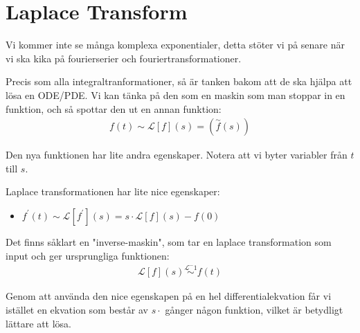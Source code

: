 \section{Laplace Transform}\par
\noindent Vi kommer inte se många komplexa exponentialer, detta stöter vi på senare när vi ska kika på fourierserier och fouriertransformationer.
\par\bigskip
\noindent Precis som alla integraltranformationer, så är tanken bakom att de ska hjälpa att lösa en ODE/PDE. Vi kan tänka på den som en maskin som man stoppar in en funktion, och så spottar den ut en annan funktion:
\begin{equation*}
  \begin{gathered}
    f(t)\sim \mathcal{L}[f](s) = (\stackrel{\sim}{f}(s))
  \end{gathered}
\end{equation*}
\par\bigskip
\noindent Den nya funktionen har lite andra egenskaper. Notera att vi byter variabler från $t$ till $s$.  
\par\bigskip
\noindent Laplace transformationen har lite nice egenskaper:\par
\begin{itemize}
  \item $f^{\prime}(t)\sim \mathcal{L}[f^{\prime}](s) = s\cdot\mathcal{L}[f](s) - f(0)$
\end{itemize}
\par\bigskip
\noindent Det finns såklart en "inverse-maskin", som tar en laplace transformation som input och ger ursprungliga funktionen:
\begin{equation*}
  \begin{gathered}
    \mathcal{L}[f](s)\stackrel{\mathcal{L}^-1}{\sim}f(t)
  \end{gathered}
\end{equation*}
\par\bigskip
\noindent Genom att använda den nice egenskapen på en hel differentialekvation får vi istället en ekvation som består av $s\cdot$ gånger någon funktion, vilket är betydligt lättare att lösa. 
\par\bigskip
